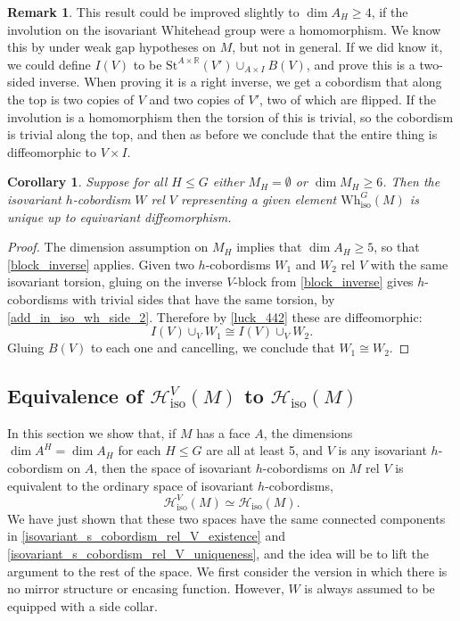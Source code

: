 \documentclass[11pt]{amsart}
\newtheorem{cor}{Corollary}[section]
\theoremstyle{definition}
\newtheorem{rem}{Remark}[section]
\numberwithin{equation}{section}
\numberwithin{figure}{section}
\newcommand{\R}{\mathbb R}
\newcommand{\Hiso}{\mathcal{H}_{\iso}}
\newcommand{\iso}{\mathrm{iso}}
\newcommand{\St}{\mathrm{St}}
\newcommand{\Wh}{\mathrm{Wh}}
\begin{document}
\begin{rem}
	This result could be improved slightly to $\dim A_H \geq 4$, if the involution on the isovariant Whitehead group were a homomorphism. We know this by \cite{connolly_luck} under weak gap hypotheses on $M$, but not in general. If we did know it, we could define $I(V)$ to be $\St^{A \times \R}(V') \cup_{A \times I} B(V)$, and prove this is a two-sided inverse. When proving it is a right inverse, we get a cobordism that along the top is two copies of $V$ and two copies of $V'$, two of which are flipped. If the involution is a homomorphism then the torsion of this is trivial, so the cobordism is trivial along the top, and then as before we conclude that the entire thing is diffeomorphic to $V \times I$.
\end{rem}

\begin{cor}\label{isovariant_s_cobordism_rel_V_uniqueness}
	Suppose for all $H \leq G$ either $M_H = \emptyset$ or $\dim M_H \geq 6$. Then the isovariant $h$-cobordism $W$ rel $V$ representing a given element $\Wh^G_{\iso}(M)$ is unique up to equivariant diffeomorphism.
\end{cor}

\begin{proof}
	The dimension assumption on $M_H$ implies that $\dim A_H \geq 5$, so that \autoref{block_inverse} applies. Given two $h$-cobordisms $W_1$ and $W_2$ rel $V$ with the same isovariant torsion, gluing on the inverse $V$-block from \autoref{block_inverse} gives $h$-cobordisms with trivial sides that have the same torsion, by \autoref{add_in_iso_wh_side_2}. Therefore by \autoref{luck_442} these are diffeomorphic:
	\[ I(V) \cup_V W_1 \cong I(V) \cup_V W_2. \]
	Gluing $B(V)$ to each one and cancelling, we conclude that $W_1 \cong W_2$.
\end{proof}

\subsection{Equivalence of $\Hiso^{V}(M)$ to $\Hiso(M)$}\label{HequalsHV}

In this section we show that, if $M$ has a face $A$,  the dimensions $\dim A^H = \dim A_H$ for each $H \leq G$ are all at least 5, and $V$ is any isovariant $h$-cobordism on $A$, then the space of isovariant $h$-cobordisms on $M$ rel $V$ is equivalent to the ordinary space of isovariant $h$-cobordisms,
\[ \Hiso^{V}(M) \simeq \Hiso(M). \]
We have just shown that these two spaces have the same connected components in \autoref{isovariant_s_cobordism_rel_V_existence} and \autoref{isovariant_s_cobordism_rel_V_uniqueness}, and the idea will be to lift the argument to the rest of the space. We first consider the version in which there is no mirror structure or encasing function. However, $W$ is always assumed to be equipped with a side collar.
\end{document}
